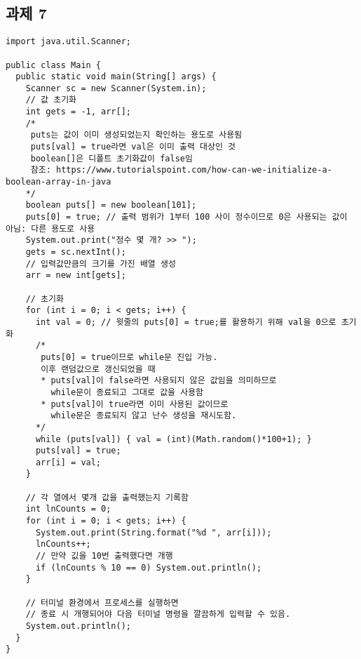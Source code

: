\documentclass{article}
\begin{document}
\subsection{과제 7}
\begin{lstlisting}
import java.util.Scanner;

public class Main {
  public static void main(String[] args) {
    Scanner sc = new Scanner(System.in);
    // 값 초기화
    int gets = -1, arr[];
    /*
     puts는 값이 이미 생성되었는지 확인하는 용도로 사용됨
     puts[val] = true라면 val은 이미 출력 대상인 것
     boolean[]은 디폴트 초기화값이 false임
     참조: https://www.tutorialspoint.com/how-can-we-initialize-a-boolean-array-in-java
    */
    boolean puts[] = new boolean[101];
    puts[0] = true; // 출력 범위가 1부터 100 사이 정수이므로 0은 사용되는 값이 아님: 다른 용도로 사용
    System.out.print("정수 몇 개? >> ");
    gets = sc.nextInt();
    // 입력값만큼의 크기를 가진 배열 생성
    arr = new int[gets];
    
    // 초기화
    for (int i = 0; i < gets; i++) {
      int val = 0; // 윗줄의 puts[0] = true;를 활용하기 위해 val을 0으로 초기화
      /*
       puts[0] = true이므로 while문 진입 가능.
       이후 랜덤값으로 갱신되었을 때
       * puts[val]이 false라면 사용되지 않은 값임을 의미하므로
         while문이 종료되고 그대로 값을 사용함
       * puts[val]이 true라면 이미 사용된 값이므로
         while문은 종료되지 않고 난수 생성을 재시도함.
      */
      while (puts[val]) { val = (int)(Math.random()*100+1); }
      puts[val] = true;
      arr[i] = val;
    }
    
    // 각 열에서 몇개 값을 출력했는지 기록함
    int lnCounts = 0;
    for (int i = 0; i < gets; i++) {
      System.out.print(String.format("%d ", arr[i]));
      lnCounts++;
      // 만약 깂을 10번 출력했다면 개행
      if (lnCounts % 10 == 0) System.out.println();
    }

    // 터미널 환경에서 프로세스를 실행하면
    // 종료 시 개행되어야 다음 터미널 명령을 깔끔하게 입력할 수 있음.
    System.out.println();
  }
}
\end{lstlisting}
\end{document}
